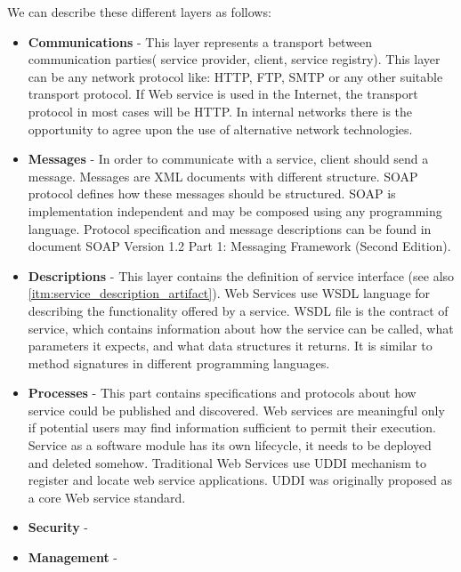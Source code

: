 We can describe these different layers as follows:
\begin{itemize}
  \item \textbf{Communications} - This layer represents a transport between
  communication parties( service provider, client, service registry). This layer
  can be any network protocol like: \gls{HTTP}, \gls{FTP}, \gls{SMTP} or any
  other suitable transport protocol. If Web service is used in the Internet, the
  transport protocol in most cases will be \gls{HTTP}. In internal networks there is the opportunity to agree upon the use of alternative
network technologies.

\item \textbf{Messages} - In order to communicate with a service, client should
send a message. Messages are \gls{XML} documents with different structure.
\gls{SOAP} protocol defines how these messages should be structured.
\gls{SOAP} is implementation independent and may be composed using any
programming language. Protocol specification and message descriptions can be
found in document SOAP Version 1.2 Part 1: Messaging Framework (Second
Edition)\cite{soap_protocol_spec}.

\item \textbf{Descriptions} - This layer contains the definition of service
interface (see also \autoref{itm:service_description_artifact}). Web Services
use \gls{WSDL} language for describing the functionality offered by a service.
\gls{WSDL} file is the contract of service, which contains information about how
the service can be called, what parameters it expects, and what data structures it returns.
It is similar to method signatures in different programming languages.

\item \textbf{Processes} - This part contains specifications and protocols
about how service could be published and discovered. Web services are meaningful
only if potential users may find information sufficient to permit their execution.
Service as a software module has its own lifecycle, it needs to be deployed and deleted somehow.
Traditional Web Services use \gls{UDDI}  mechanism to register and locate web
service applications. \gls{UDDI} was originally proposed as a core Web service
standard.

\item \textbf{Security} -

\item \textbf{Management} -
\end{itemize}

